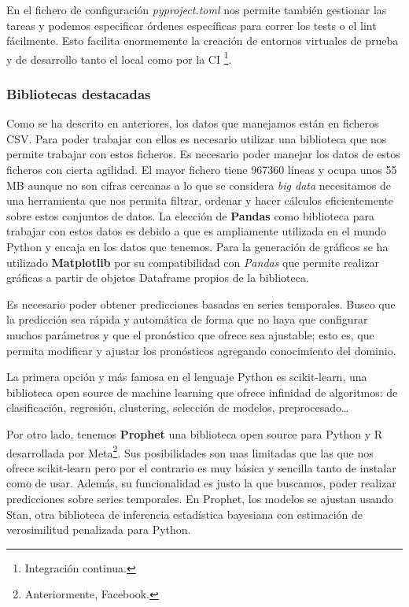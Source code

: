 En el fichero de configuración \textit{pyproject.toml} nos permite también gestionar las
tareas y podemos especificar órdenes específicas para correr los tests o el lint
fácilmente. Esto facilita enormemente la creación de entornos virtuales de prueba y de
desarrollo tanto el local como por la CI \footnote{Integración continua.}.


\subsubsection{Bibliotecas destacadas}
Como se ha descrito en anteriores, los datos que manejamos están en ficheros CSV. Para
poder trabajar con ellos es necesario utilizar una biblioteca que nos permite trabajar con
estos ficheros. Es necesario poder manejar los datos de estos ficheros con cierta
agilidad. El mayor fichero tiene 967360 líneas y ocupa unos 55 MB aunque no son cifras
cercanas a lo que se considera \textit{big data} necesitamos de una herramienta que nos
permita filtrar, ordenar y hacer cálculos eficientemente sobre estos conjuntos de datos.
La elección de \textbf{Pandas} como biblioteca para trabajar con estos datos es debido a
que es ampliamente utilizada en el mundo Python y encaja en los datos que tenemos. Para la
generación de gráficos se ha utilizado \textbf{Matplotlib}  por su compatibilidad con
\textit{Pandas} que permite realizar gráficas a partir de objetos Dataframe propios de la
biblioteca.

Es necesario poder obtener predicciones basadas en series temporales. Busco que la
predicción sea rápida y automática de forma que no haya que configurar muchos parámetros y
que el pronóstico que ofrece sea ajustable; esto es, que permita modificar y ajustar los
pronósticos agregando conocimiento del dominio.

La primera opción y más famosa en el lenguaje Python es scikit-learn, una biblioteca open
source de machine learning que ofrece infinidad de algoritmos: de clasificación,
regresión, clustering, selección de modelos, preprocesado\ldots

Por otro lado, tenemos \textbf{Prophet} una biblioteca open source para Python y R
desarrollada por Meta\footnote{Anteriormente, Facebook.}. Sus posibilidades son mas
limitadas que las que nos ofrece scikit-learn pero por el contrario es muy básica y
sencilla tanto de instalar como de usar. Además, su funcionalidad es justo la que
buscamos, poder realizar predicciones sobre series temporales. En Prophet, los modelos se
ajustan usando Stan, otra biblioteca de inferencia estadística bayesiana con estimación de
verosimilitud penalizada para Python.

